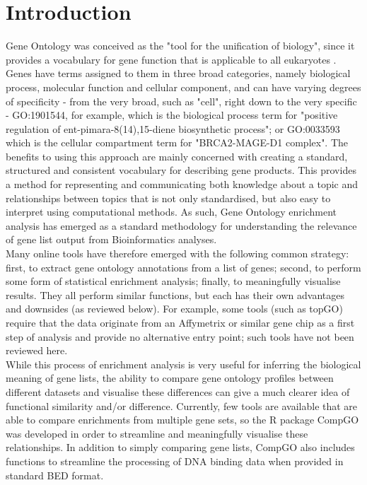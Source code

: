 \documentclass[11pt, oneside]{article}
\begin{document}
\section*{Introduction}
Gene Ontology was conceived as the "tool for the unification of biology", since it provides a vocabulary for gene function that is applicable to all eukaryotes \cite{GOConsort00}. Genes have terms assigned to them in three broad categories, namely biological process, molecular function and cellular component, and can have varying degrees of specificity - from the very broad, such as "cell", right down to the very specific - GO:1901544, for example, which is the biological process term for "positive regulation of ent-pimara-8(14),15-diene biosynthetic process"; or GO:0033593 which is the cellular compartment term for "BRCA2-MAGE-D1 complex". The benefits to using this approach are mainly concerned with creating a standard, structured and consistent vocabulary for describing gene products. This provides a method for representing and communicating both knowledge about a topic and relationships between topics that is not only standardised, but also easy to interpret using computational methods. As such, Gene Ontology enrichment analysis has emerged as a standard methodology for understanding the relevance of gene list output from Bioinformatics analyses.\\
Many online tools have therefore emerged with the following common strategy: first, to extract gene ontology annotations from a list of genes; second, to perform some form of statistical enrichment analysis; finally, to meaningfully visualise results. They all perform similar functions, but each has their own advantages and downsides (as reviewed below). For example, some tools (such as topGO) require that the data originate from an Affymetrix or similar gene chip as a first step of analysis and provide no alternative entry point; such tools have not been reviewed here.\\
While this process of enrichment analysis is very useful for inferring the biological meaning of gene lists, the ability to compare gene ontology profiles between different datasets and visualise these differences can give a much clearer idea of functional similarity and/or difference. Currently, few tools are available that are able to compare enrichments from multiple gene sets, so the R package CompGO was developed in order to streamline and meaningfully visualise these relationships. In addition to simply comparing gene lists, CompGO also includes functions to streamline the processing of DNA binding data when provided in standard BED format.\\
\end{document}
